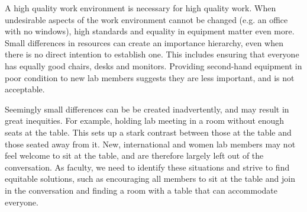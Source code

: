 \documentclass[11pt]{article}
\begin{document}







A high quality work environment is necessary for high quality work. When undesirable aspects of the work environment cannot be changed (e.g. an office with no windows), high standards and equality in equipment matter even more. Small differences in resources can create an importance hierarchy, even when there is no direct intention to establish one. This includes ensuring that everyone has equally good chairs, desks and monitors. Providing second-hand equipment in poor condition to new lab members suggests they are less important, and is not acceptable.




Seemingly small differences can be be created inadvertently, and may result in great inequities. For example, holding lab meeting in a room without enough seats at the table. This sets up a stark contrast between those at the table and those seated away from it. New, international and women lab members may not feel welcome to sit at the table, and are therefore largely left out of the conversation. As faculty, we need to identify these situations and strive to find equitable solutions, such as encouraging all members to sit at the table and join in the conversation and finding a room with a table that can accommodate everyone. 
\end{document}
